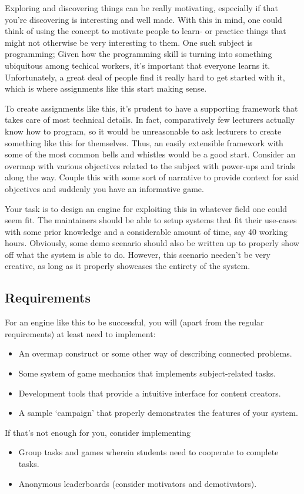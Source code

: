 \begin{refsection}
Exploring and discovering things can be really motivating, especially if that you're discovering is interesting and well made. With this in mind, one could think of using the concept to motivate people to learn- or practice things that might not otherwise be very interesting to them. One such subject is programming; Given how the programming skill is turning into something ubiquitous among techical workers, it's important that everyone learns it. Unfortunately, a great deal of people find it really hard to get started with it, which is where assignments like this start making sense.

To create assignments like this, it's prudent to have a supporting framework that takes care of most technical details. In fact, comparatively few lecturers actually know how to program, so it would be unreasonable to ask lecturers to create something like this for themselves. Thus, an easily extensible framework with some of the most common bells and whistles would be a good start. Consider an overmap with various objectives related to the subject with power-ups and trials along the way. Couple this with some sort of narrative to provide context for said objectives and suddenly you have an informative game.

Your task is to design an engine for exploiting this in whatever field one could seem fit. The maintainers should be able to setup systems that fit their use-cases with some prior knowledge and a considerable amount of time, say 40 working hours. Obviously, some demo scenario should also be written up to properly show off what the system is able to do. However, this scenario needen't be very creative, as long as it properly showcases the entirety of the system.

\subsection*{Requirements}
For an engine like this to be successful, you will (apart from the regular requirements) at least need to implement:
\begin{itemize}
    \item An overmap construct or some other way of describing connected problems.
    \item Some system of game mechanics that implements subject-related tasks.
    \item Development tools that provide a intuitive interface for content creators.
    \item A sample `campaign' that properly demonstrates the features of your system.
\end{itemize}
If that's not enough for you, consider implementing
\begin{itemize}
    \item Group tasks and games wherein students need to cooperate to complete tasks.
    \item Anonymous leaderboards (consider motivators and demotivators).
\end{itemize}

\end{refsection}
